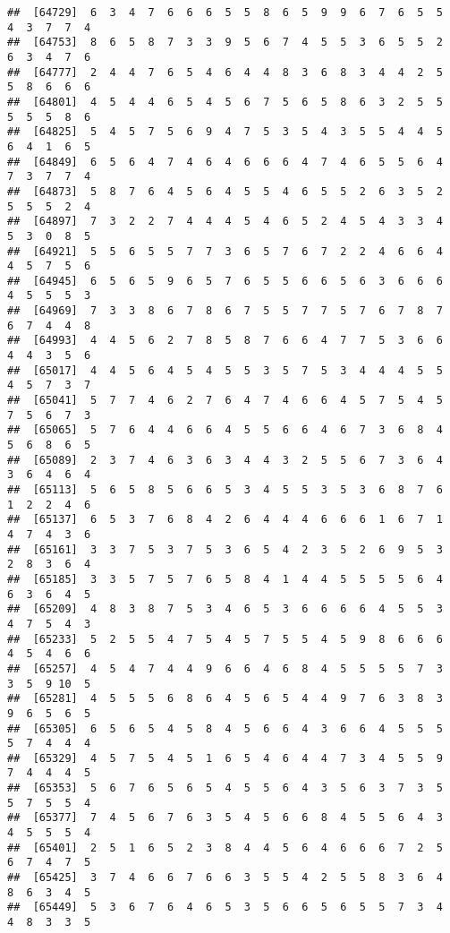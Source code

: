 \documentclass[
]{book}
\begin{document}
\begin{verbatim}
##  [64729]  6  3  4  7  6  6  6  5  5  8  6  5  9  9  6  7  6  5  5  4  3  7  7  4
##  [64753]  8  6  5  8  7  3  3  9  5  6  7  4  5  5  3  6  5  5  2  6  3  4  7  6
##  [64777]  2  4  4  7  6  5  4  6  4  4  8  3  6  8  3  4  4  2  5  5  8  6  6  6
##  [64801]  4  5  4  4  6  5  4  5  6  7  5  6  5  8  6  3  2  5  5  5  5  5  8  6
##  [64825]  5  4  5  7  5  6  9  4  7  5  3  5  4  3  5  5  4  4  5  6  4  1  6  5
##  [64849]  6  5  6  4  7  4  6  4  6  6  6  4  7  4  6  5  5  6  4  7  3  7  7  4
##  [64873]  5  8  7  6  4  5  6  4  5  5  4  6  5  5  2  6  3  5  2  5  5  5  2  4
##  [64897]  7  3  2  2  7  4  4  4  5  4  6  5  2  4  5  4  3  3  4  5  3  0  8  5
##  [64921]  5  5  6  5  5  7  7  3  6  5  7  6  7  2  2  4  6  6  4  4  5  7  5  6
##  [64945]  6  5  6  5  9  6  5  7  6  5  5  6  6  5  6  3  6  6  6  4  5  5  5  3
##  [64969]  7  3  3  8  6  7  8  6  7  5  5  7  7  5  7  6  7  8  7  6  7  4  4  8
##  [64993]  4  4  5  6  2  7  8  5  8  7  6  6  4  7  7  5  3  6  6  4  4  3  5  6
##  [65017]  4  4  5  6  4  5  4  5  5  3  5  7  5  3  4  4  4  5  5  4  5  7  3  7
##  [65041]  5  7  7  4  6  2  7  6  4  7  4  6  6  4  5  7  5  4  5  7  5  6  7  3
##  [65065]  5  7  6  4  4  6  6  4  5  5  6  6  4  6  7  3  6  8  4  5  6  8  6  5
##  [65089]  2  3  7  4  6  3  6  3  4  4  3  2  5  5  6  7  3  6  4  3  6  4  6  4
##  [65113]  5  6  5  8  5  6  6  5  3  4  5  5  3  5  3  6  8  7  6  1  2  2  4  6
##  [65137]  6  5  3  7  6  8  4  2  6  4  4  4  6  6  6  1  6  7  1  4  7  4  3  6
##  [65161]  3  3  7  5  3  7  5  3  6  5  4  2  3  5  2  6  9  5  3  2  8  3  6  4
##  [65185]  3  3  5  7  5  7  6  5  8  4  1  4  4  5  5  5  5  6  4  6  3  6  4  5
##  [65209]  4  8  3  8  7  5  3  4  6  5  3  6  6  6  6  4  5  5  3  4  7  5  4  3
##  [65233]  5  2  5  5  4  7  5  4  5  7  5  5  4  5  9  8  6  6  6  4  5  4  6  6
##  [65257]  4  5  4  7  4  4  9  6  6  4  6  8  4  5  5  5  5  7  3  3  5  9 10  5
##  [65281]  4  5  5  5  6  8  6  4  5  6  5  4  4  9  7  6  3  8  3  9  6  5  6  5
##  [65305]  6  5  6  5  4  5  8  4  5  6  6  4  3  6  6  4  5  5  5  5  7  4  4  4
##  [65329]  4  5  7  5  4  5  1  6  5  4  6  4  4  7  3  4  5  5  9  7  4  4  4  5
##  [65353]  5  6  7  6  5  6  5  4  5  5  6  4  3  5  6  3  7  3  5  5  7  5  5  4
##  [65377]  7  4  5  6  7  6  3  5  4  5  6  6  8  4  5  5  6  4  3  4  5  5  5  4
##  [65401]  2  5  1  6  5  2  3  8  4  4  5  6  4  6  6  6  7  2  5  6  7  4  7  5
##  [65425]  3  7  4  6  6  7  6  6  3  5  5  4  2  5  5  8  3  6  4  8  6  3  4  5
##  [65449]  5  3  6  7  6  4  6  5  3  5  6  6  5  6  5  5  7  3  4  4  8  3  3  5

\end{verbatim}
\end{document}
